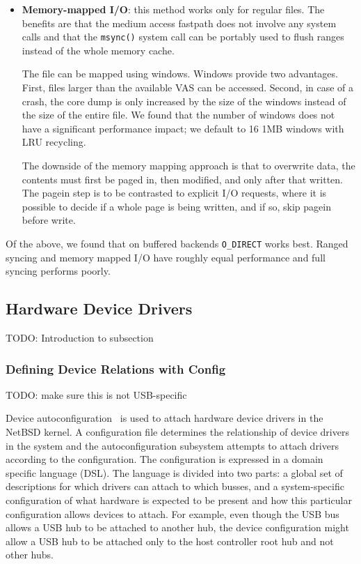 \begin{itemize}
\item   \textbf{Memory-mapped I/O}: this method
        works only for regular files.  The benefits are that the
        medium access fastpath does not involve any system calls
        and that the \texttt{msync()} system call can be portably
        used to flush ranges instead of the whole memory cache.

	The file can be mapped using windows.  Windows provide two
	advantages.  First, files larger than the available VAS
	can be accessed.  Second, in case of a crash, the core dump is only
	increased by the size of the windows instead of the size of the
	entire file.  We found that the number of windows does not have a
	significant performance impact; we default to 16 1MB windows
	with LRU recycling.

        The downside of the memory mapping approach is that to
        overwrite data, the contents must first be paged in, then
        modified, and only after that written.  The pagein step is to
        be contrasted to explicit I/O requests, where it is possible to
        decide if a whole page is being written, and if so, skip pagein
        before write.
\end{itemize}

Of the above, we found that on buffered backends \verb+O_DIRECT+
works best.  Ranged syncing and memory mapped I/O have roughly
equal performance and full syncing performs poorly.


\subsection{Hardware Device Drivers}

TODO: Introduction to subsection

\subsubsection{Defining Device Relations with Config}
\label{sect:config}

TODO: make sure this is not USB-specific

Device autoconfiguration~\cite{torek:config} is used to attach
hardware device drivers in the NetBSD kernel.  A configuration file
determines the relationship of device drivers in the system and
the autoconfiguration subsystem attempts to attach drivers according
to the configuration.  The configuration is expressed in a domain
specific language (DSL).  The language is divided into two parts:
a global set of descriptions for which drivers can attach to which
busses, and a system-specific configuration of what hardware is
expected to be present and how this particular configuration allows
devices to attach.  For example, even though the USB bus allows a
USB hub to be attached to another hub, the device configuration
might allow a USB hub to be attached only to the host controller
root hub and not other hubs.

